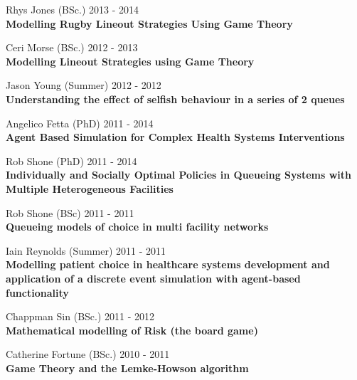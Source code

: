 \documentclass[10pt]{res} %
\begin{document}
\begin{resume}
\begin{etaremune}
\item
    Rhys Jones (BSc.) \hfill 2013 -
    2014\\
\textbf{Modelling Rugby Lineout Strategies Using Game Theory}\\

\item
    Ceri Morse (BSc.) \hfill 2012 -
    2013\\
\textbf{Modelling Lineout Strategies using Game Theory}\\

\item
    Jason Young (Summer) \hfill 2012 -
    2012\\
\textbf{Understanding the effect of selfish behaviour in a series of 2 queues}\\

\item
    Angelico Fetta (PhD) \hfill 2011 -
    2014\\
\textbf{Agent Based Simulation for Complex Health Systems Interventions}\\

\item
    Rob Shone (PhD) \hfill 2011 -
    2014\\
\textbf{Individually and Socially Optimal Policies in Queueing Systems with Multiple Heterogeneous Facilities}\\

\item
    Rob Shone (BSc) \hfill 2011 -
    2011\\
\textbf{Queueing models of choice in multi facility networks}\\

\item
    Iain Reynolds (Summer) \hfill 2011 -
    2011\\
\textbf{Modelling patient choice in healthcare systems development and application of a discrete event simulation with agent-based functionality}\\

\item
    Chappman Sin (BSc.) \hfill 2011 -
    2012\\
\textbf{Mathematical modelling of Risk (the board game)}\\

\item
    Catherine Fortune (BSc.) \hfill 2010 -
    2011\\
\textbf{Game Theory and the Lemke-Howson algorithm}\\


\end{etaremune}
\end{resume}
\end{document}
